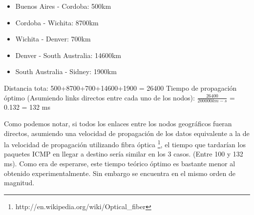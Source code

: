 \begin{itemize}
	\item Buenos Aires - Cordoba: 500km
	\item Cordoba - Wichita: 8700km
	\item Wichita - Denver: 700km
	\item Denver - South Australia: 14600km
	\item South Australia - Sidney:  1900km
\end{itemize}

Distancia tota: 500+8700+700+14600+1900 = 26400
Tiempo de propagación óptimo (Asumiendo links directos entre cada uno de los nodos):
$\frac{26400}{200000km-s}$ = 0.132 = 132 ms

Como podemos notar, si todos los enlaces entre los nodos geográficos fueran directos,
asumiendo una velocidad de propagación de los datos equivalente a la de la velocidad
de propagación utilizando fibra óptica \footnote{http://en.wikipedia.org/wiki/Optical\_fiber}, el tiempo que tardarían los paquetes ICMP en llegar a destino sería similar en los 3 casos. (Entre 100 y 132 ms). Como era de esperarse, este tiempo teórico óptimo es bastante menor al obtenido experimentalmente. Sin embargo se encuentra en el mismo orden de magnitud.



















